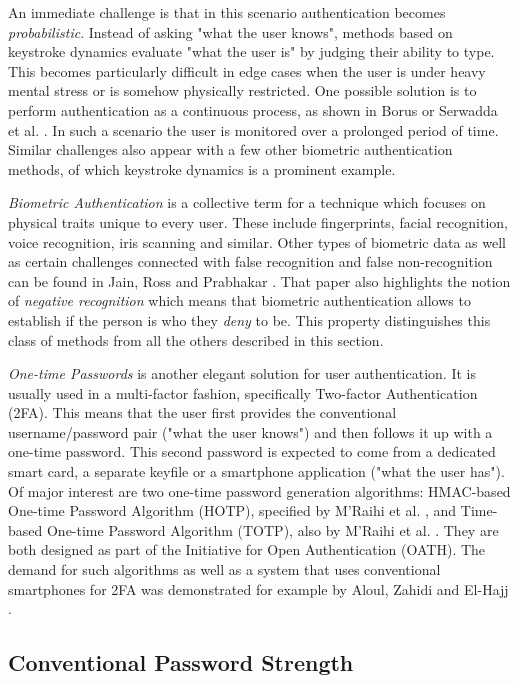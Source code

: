 An immediate challenge is that in this scenario authentication becomes \emph{probabilistic}. Instead of asking "what the user knows", methods based on keystroke dynamics evaluate "what the user is" by judging their ability to type. This becomes particularly difficult in edge cases when the user is under heavy mental stress or is somehow physically restricted. One possible solution is to perform authentication as a continuous process, as shown in Borus \cite{bours2012continuous} or Serwadda et al. \cite{serwadda2013scan}. In such a scenario the user is monitored over a prolonged period of time. Similar challenges also appear with a few other biometric authentication methods, of which keystroke dynamics is a prominent example.

\emph{Biometric Authentication} is a collective term for a technique which focuses on physical traits unique to every user. These include fingerprints, facial recognition, voice recognition, iris scanning and similar. Other types of biometric data as well as certain challenges connected with false recognition and false non-recognition can be found in Jain, Ross and Prabhakar \cite{jain:2004:intro-to-biometric}. That paper also highlights the notion of \emph{negative recognition} which means that biometric authentication allows to establish if the person is who they \emph{deny} to be. This property distinguishes this class of methods from all the others described in this section.

\emph{One-time Passwords} is another elegant solution for user authentication. It is usually used in a multi-factor fashion, specifically Two-factor Authentication (2FA). This means that the user first provides the conventional username/password pair ("what the user knows") and then follows it up with a one-time password. This second password is expected to come from a dedicated smart card, a separate keyfile or a smartphone application ("what the user has"). Of major interest are two one-time password generation algorithms: HMAC-based One-time Password Algorithm (HOTP), specified by M’Raihi et al. \cite{rfc4226}, and Time-based One-time Password Algorithm (TOTP), also by M’Raihi et al. \cite{rfc6238}. They are both designed as part of the Initiative for Open Authentication (OATH). The demand for such algorithms as well as a system that uses conventional smartphones for 2FA was demonstrated for example by
Aloul, Zahidi and El-Hajj \cite{aloul:2009:two-factor-auth}.

\subsection{Conventional Password Strength}
\label{subsec:password-strength}


